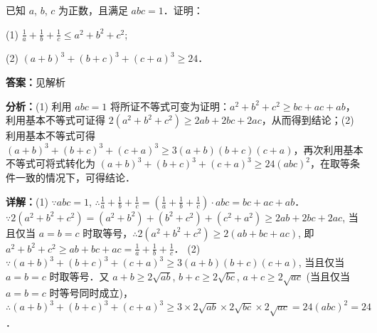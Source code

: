 \begin{question}[points=10]
[选修 4—5：不等式选讲]

已知 $a$, $b$, $c$ 为正数，且满足 $abc = 1$．证明：

(1) $\frac{1}{a} + \frac{1}{b} + \frac{1}{c} \le a^2 + b^2 + c^2$;

(2) $(a + b)^3 + (b + c)^3 + (c + a)^3 \ge 24$．
\begin{solution}
\textbf{答案：}见解析

\textbf{分析：}(1) 利用 $abc = 1$ 将所证不等式可变为证明：$a^2 + b^2 + c^2 \ge bc + ac + ab$，利用基本不等式可证得 $2(a^2 + b^2 + c^2) \ge 2ab + 2bc + 2ac$，从而得到结论；(2) 利用基本不等式可得 $(a+b)^3 + (b+c)^3 + (c+a)^3 \ge 3(a+b)(b+c)(c+a)$，再次利用基本不等式可将式转化为 $(a+b)^3 + (b+c)^3 + (c+a)^3 \ge 24(abc)^2$，在取等条件一致的情况下，可得结论．

\textbf{详解：}(1) $\because abc = 1$, $\therefore \frac{1}{a} + \frac{1}{b} + \frac{1}{c} = \left(\frac{1}{a} + \frac{1}{b} + \frac{1}{c}\right) \cdot abc = bc + ac + ab$．$\because 2(a^2 + b^2 + c^2) = (a^2 + b^2) + (b^2 + c^2) + (c^2 + a^2) \ge 2ab + 2bc + 2ac$, 当且仅当 $a = b = c$ 时取等号，$\therefore 2(a^2 + b^2 + c^2) \ge 2(ab + bc + ac)$, 即 $a^2 + b^2 + c^2 \ge ab + bc + ac = \frac{1}{a} + \frac{1}{b} + \frac{1}{c}$．
(2) $\because (a+b)^3 + (b+c)^3 + (c+a)^3 \ge 3(a+b)(b+c)(c+a)$, 当且仅当 $a = b = c$ 时取等号．又 $a+b \ge 2\sqrt{ab}$, $b+c \ge 2\sqrt{bc}$, $a+c \ge 2\sqrt{ac}$ (当且仅当 $a = b = c$ 时等号同时成立)，$\therefore (a+b)^3 + (b+c)^3 + (c+a)^3 \ge 3 \times 2\sqrt{ab} \times 2\sqrt{bc} \times 2\sqrt{ac} = 24(abc)^2 = 24$．
\end{solution}
\end{question}

